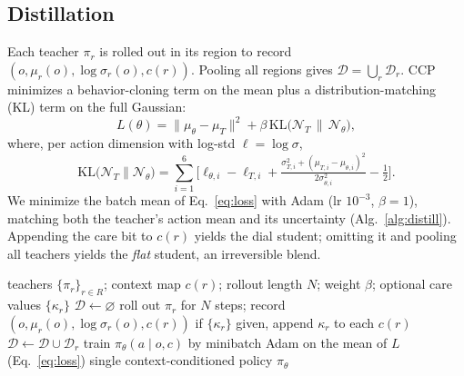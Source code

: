 \documentclass[conference]{IEEEtran}
\begin{document}
\subsection{Distillation}
\label{sec:distill}
Each teacher $\pi_r$ is rolled out in its region to record $(o,\mu_r(o),\log\sigma_r(o),c(r))$.
Pooling all regions gives $\mathcal{D}{=}\bigcup_r\mathcal{D}_r$. CCP minimizes a
behavior-cloning term on the mean plus a distribution-matching (KL) term on the full Gaussian:
\begin{equation}
L(\theta)=\lVert\mu_\theta-\mu_T\rVert^2 + \beta\,\mathrm{KL}\!\big(\mathcal{N}_T\,\|\,\mathcal{N}_\theta\big),
\label{eq:loss}
\end{equation}
where, per action dimension with log-std $\ell{=}\log\sigma$,
\begin{equation}
\mathrm{KL}\!\big(\mathcal{N}_T\|\mathcal{N}_\theta\big)=\!\sum_{i=1}^{6}\!\Big[\ell_{\theta,i}-\ell_{T,i}
+\tfrac{\sigma_{T,i}^2+(\mu_{T,i}-\mu_{\theta,i})^2}{2\sigma_{\theta,i}^2}-\tfrac12\Big].
\label{eq:kl}
\end{equation}
We minimize the batch mean of Eq.~\ref{eq:loss} with Adam (lr $10^{-3}$, $\beta{=}1$),
matching both the teacher's action mean and its uncertainty (Alg.~\ref{alg:distill}).
Appending the care bit to $c(r)$ yields the dial student; omitting it and pooling all teachers
yields the \emph{flat} student, an irreversible blend.

\begin{algorithm}[t]
\caption{Context-Conditioned Distillation}
\label{alg:distill}
\begin{algorithmic}[1]
\Require teachers $\{\pi_r\}_{r\in R}$; context map $c(r)$; rollout length $N$; weight $\beta$;
optional care values $\{\kappa_r\}$
\State $\mathcal{D}\gets\varnothing$
  \State roll out $\pi_r$ for $N$ steps; record $(o,\mu_r(o),\log\sigma_r(o),c(r))$
  \State if $\{\kappa_r\}$ given, append $\kappa_r$ to each $c(r)$
  \State $\mathcal{D}\gets\mathcal{D}\cup\mathcal{D}_r$
\EndFor
\State train $\pi_\theta(a\mid o,c)$ by minibatch Adam on the mean of $L$ (Eq.~\ref{eq:loss})
\State \Return single context-conditioned policy $\pi_\theta$
\end{algorithmic}
\end{algorithm}
\end{document}
